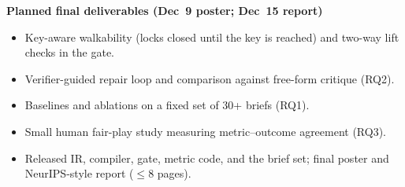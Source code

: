 \documentclass[11pt]{article}
\begin{document}
\vspace{0.2em}
\noindent\textbf{Planned final deliverables (Dec~9 poster; Dec~15 report)}
\begin{itemize}
  \item Key-aware walkability (locks closed until the key is reached) and two-way lift checks in the gate.
  \item Verifier-guided repair loop and comparison against free-form critique (RQ2).
  \item Baselines and ablations on a fixed set of 30+ briefs (RQ1).
  \item Small human fair-play study measuring metric--outcome agreement (RQ3).
  \item Released IR, compiler, gate, metric code, and the brief set; final poster and NeurIPS-style report ($\leq$8 pages).
\end{itemize}
\end{document}
